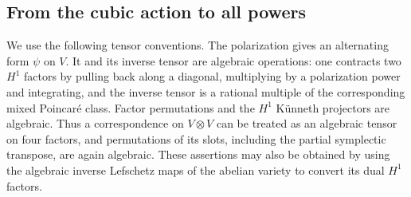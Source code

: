 \subsection{From the cubic action to all powers}

We use the following tensor conventions. The polarization gives an alternating form \(\psi\) on \(V\). It and its inverse tensor are algebraic operations: one contracts two \(H^1\) factors by pulling back along a diagonal, multiplying by a polarization power and integrating, and the inverse tensor is a rational multiple of the corresponding mixed Poincar\'e class. Factor permutations and the \(H^1\) K\"unneth projectors are algebraic. Thus a correspondence on \(V\otimes V\) can be treated as an algebraic tensor on four factors, and permutations of its slots, including the partial symplectic transpose, are again algebraic. These assertions may also be obtained by using the algebraic inverse Lefschetz maps of the abelian variety to convert its dual \(H^1\) factors.

